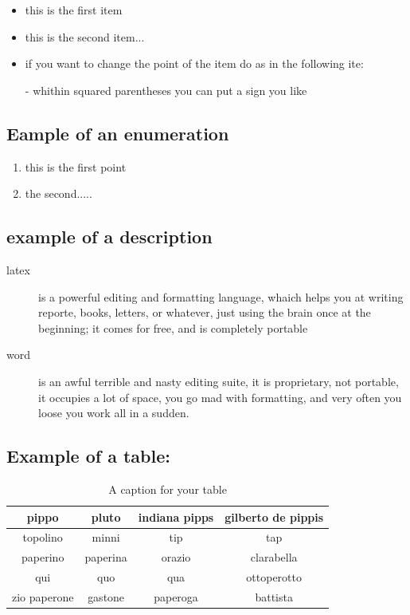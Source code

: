 \begin{itemize}
\item this is the first item
\item this is the second item...
\item if you want to change the point of the item do as in the following ite:
\item[-] whithin squared parentheses you can put a sign you like
\end{itemize} 


\subsection{Eample of an enumeration}

\begin{enumerate}
\item this is the first point
\item the second.....
\end{enumerate}



\subsection{example of a description}
\begin{description}
\item[latex] is a powerful editing and formatting language, whaich helps you
at writing reporte, books, letters, or whatever, just using the brain 
once at the beginning; it comes for free, and is completely portable
\item[word] is an awful terrible and nasty editing suite, it is proprietary,
not portable, it occupies a lot of space, you go mad with formatting,
and very often you loose you work all in a sudden. 
\end{description}


\subsection{Example of a table:}

\begin{table}
\begin{center}
\begin{tabular}{|c|c|c|c|}
\hline
pippo & pluto & indiana pipps & gilberto de pippis \\
\hline
topolino & minni & tip & tap \\
\hline
\hline
paperino & paperina & orazio & clarabella \\
\hline
qui & quo & qua & ottoperotto \\
zio paperone & gastone & paperoga & battista \\ 
\hline 
\end{tabular}
\end{center}
\caption{A caption for your table}
\label{A-lable-for-your-table}
\end{table}


